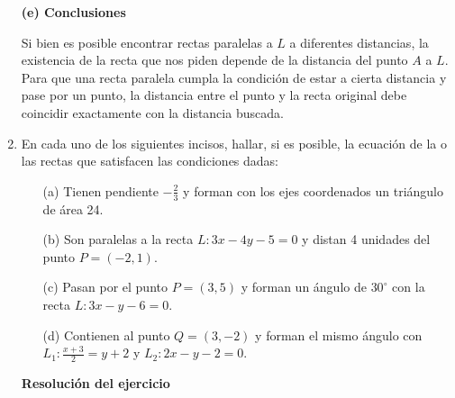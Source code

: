 \documentclass[11pt]{article}
\begin{document}
\begin{enumerate}[\hspace{-5mm} 1) ]
\bigskip  

\textbf{(e) Conclusiones}

Si bien es posible encontrar rectas paralelas a $L$ a diferentes distancias, la existencia de la recta que nos piden depende de la distancia del punto $A$ a $L$. Para que una recta paralela cumpla la condición de estar a cierta distancia y pase por un punto, la distancia entre el punto y la recta original debe coincidir exactamente con la distancia buscada.

\bigskip







































\item  En cada uno de los siguientes incisos, hallar, si es posible, la ecuación de la o las rectas que satisfacen las condiciones dadas:

\begin{itemize}
    \item[(a)] Tienen pendiente $-\frac{2}{3}$ y forman con los ejes coordenados un triángulo de área 24.
    \item[(b)] Son paralelas a la recta $L : 3x - 4y - 5 = 0$ y distan 4 unidades del punto $P = (-2, 1)$.
    \item[(c)] Pasan por el punto $P = (3, 5)$ y forman un ángulo de $30^\circ$ con la recta $L : 3x - y - 6 = 0$.
    \item[(d)] Contienen al punto $Q = (3,-2)$ y forman el mismo ángulo con $L_1 : \frac{x + 3}{2} = y + 2$ y $L_2 : 2x - y - 2 = 0$.
\end{itemize}







    \textbf{Resolución del ejercicio}

\end{enumerate}
\end{document}
